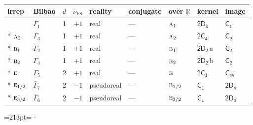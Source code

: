 \documentclass[10pt,a4paper]{article}
\makeatletter
\def\grouprule#1#2{\noalign{\marks\LTgroupmarks{\the\belowrulesep}\nobreak\vskip#1%
  \vskip\aboverulesep}\multispan\LT@cols\unskip{\leaders\hrule\@height#2\hfill\kern\z@}\cr
  \noalign{\penalty\LTrulebreak\vskip\belowrulesep\global\@lastruleclass\z@}}
\newcommand{\needspace}[1]{\par\penalty-100\begingroup\dimen0=#1\relax\dimen2=\pagegoal
  \advance\dimen2-\pagetotal\ifdim\dimen0>\dimen2\relax\ifdim\dimen2>0pt\vfil\break\fi\fi
  \endgroup}
\numberwithin{equation}{section}
\newcommand{\grp}[1]{\mathsf{#1}}
\newcommand{\irr}[1]{\text{\normalfont\scshape #1}}
\newcommand{\detbox}[1]{{\setlength{\fboxsep}{1pt}\fbox{#1}}}
\newcommand{\clsletter}[1]{\,{\scriptsize\color{black!55}#1}}
\newcommand{\fsind}{\nu_{\mathrm{FS}}}
\makeatother
\begin{document}
{\small\renewcommand{\arraystretch}{1.25}\setlength{\tabcolsep}{4pt}\begin{longtable}{@{}llrrlllll@{}}\toprule
irrep & Bilbao & $d$ & $\fsind$ & reality & conjugate & over $\mathbb{R}$ & kernel & image\\\midrule\endhead
\bottomrule\endfoot\endlastfoot
\detbox{$\irr{a}_{1}$} & $\Gamma_{1}$ & 1 & $+1$ & real & --- & $\irr{a}_{1}$ & \href{2D4.pdf}{$\grp{2D_{4}}$} & \href{../../../rotation/data/pdf/C1.pdf}{$\grp{C_{1}}$}\\*
$\irr{a}_{2}$ & $\Gamma_{3}$ & 1 & $+1$ & real & --- & $\irr{a}_{2}$ & \href{2C4.pdf}{$\grp{2C_{4}}$} & \href{../../../rotation/data/pdf/C2.pdf}{$\grp{C_{2}}$}\\*
$\irr{b}_{1}$ & $\Gamma_{2}$ & 1 & $+1$ & real & --- & $\irr{b}_{1}$ & \href{2D2.pdf}{$\grp{2D_{2}}$}\clsletter{a} & \href{../../../rotation/data/pdf/C2.pdf}{$\grp{C_{2}}$}\\*
$\irr{b}_{2}$ & $\Gamma_{4}$ & 1 & $+1$ & real & --- & $\irr{b}_{2}$ & \href{2D2.pdf}{$\grp{2D_{2}}$}\clsletter{b} & \href{../../../rotation/data/pdf/C2.pdf}{$\grp{C_{2}}$}\\*
$\irr{e}$ & $\Gamma_{5}$ & 2 & $+1$ & real & --- & $\irr{e}$ & \href{2C1.pdf}{$\grp{2C_{1}}$} & \href{../../../rotation/data/pdf/C4v.pdf}{$\grp{C_{4v}}$}\\*
\grouprule{0pt}{\lightrulewidth}
$\irr{e}_{1/2}$ & $\bar{\Gamma}_{7}$ & 2 & $-1$ & pseudoreal & --- & $\irr{e}_{1/2}$ & \href{C1.pdf}{$\grp{C_{1}}$} & \href{2D4.pdf}{$\grp{2D_{4}}$}\\*
$\irr{e}_{3/2}$ & $\bar{\Gamma}_{6}$ & 2 & $-1$ & pseudoreal & --- & $\irr{e}_{3/2}$ & \href{C1.pdf}{$\grp{C_{1}}$} & \href{2D4.pdf}{$\grp{2D_{4}}$}\\
\bottomrule\end{longtable}}
\needspace{213pt}
\end{document}
